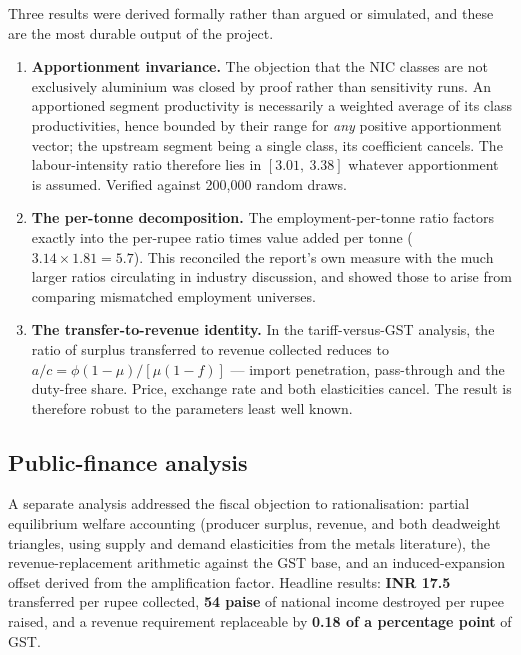 \documentclass[11pt, a4paper]{article}
\begin{document}
Three results were derived formally rather than argued or simulated, and these are
the most durable output of the project.

\begin{enumerate}[leftmargin=1.6em, itemsep=4pt]
\item \textbf{Apportionment invariance.} The objection that the NIC classes are not
exclusively aluminium was closed by proof rather than sensitivity runs. An
apportioned segment productivity is necessarily a weighted average of its class
productivities, hence bounded by their range for \emph{any} positive apportionment
vector; the upstream segment being a single class, its coefficient cancels. The
labour-intensity ratio therefore lies in $[3.01,\ 3.38]$ whatever apportionment is
assumed. Verified against 200,000 random draws.

\item \textbf{The per-tonne decomposition.} The employment-per-tonne ratio factors
exactly into the per-rupee ratio times value added per tonne
($3.14 \times 1.81 = 5.7$). This reconciled the report's own measure with the much
larger ratios circulating in industry discussion, and showed those to arise from
comparing mismatched employment universes.

\item \textbf{The transfer-to-revenue identity.} In the tariff-versus-GST analysis,
the ratio of surplus transferred to revenue collected reduces to
$a/c = \phi(1-\mu)/[\mu(1-f)]$ --- import penetration, pass-through and the duty-free
share. Price, exchange rate and both elasticities cancel. The result is therefore
robust to the parameters least well known.
\end{enumerate}

\subsection{Public-finance analysis}

A separate analysis addressed the fiscal objection to rationalisation: partial
equilibrium welfare accounting (producer surplus, revenue, and both deadweight
triangles, using supply and demand elasticities from the metals literature), the
revenue-replacement arithmetic against the GST base, and an induced-expansion offset
derived from the amplification factor. Headline results: \textbf{INR 17.5}
transferred per rupee collected, \textbf{54 paise} of national income destroyed per
rupee raised, and a revenue requirement replaceable by \textbf{0.18 of a percentage
point} of GST.
\end{document}

